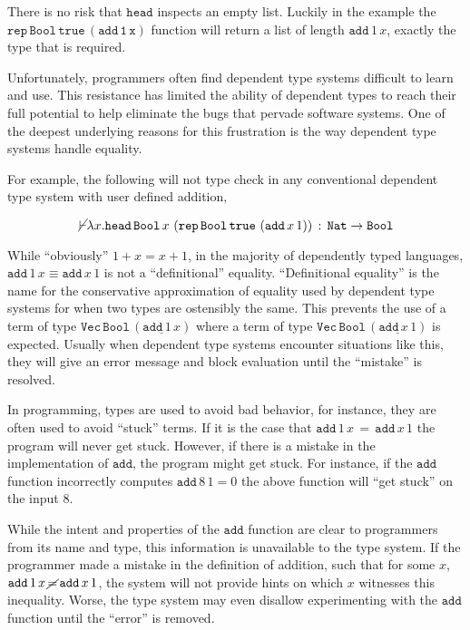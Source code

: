 There is no risk that $\mathtt{head}$ inspects an empty list.
Luckily in the example the $\mathtt{\mathtt{rep}\,\mathtt{Bool}\,\mathtt{true}\,\left(\mathtt{add}\,1\,x\right)}$ function will return a list of length $\mathtt{add}\,1\,x$, exactly the type that is required.


Unfortunately, programmers often find dependent type systems difficult to learn and use.
This resistance has limited the ability of dependent types to reach their full potential to help eliminate the bugs that pervade software systems.
One of the deepest underlying reasons for this frustration is the way dependent type systems handle equality.

For example, the following will not type check in any conventional dependent type system with user defined addition,

\[
\cancel{\vdash}\lambda x.\mathtt{head}\,\mathtt{Bool}\,x\,\left(\mathtt{rep}\,\mathtt{Bool}\,\mathtt{true}\,\left(\mathtt{add}\,x\,1\right)\right)\,:\,\mathtt{Nat}\rightarrow\mathtt{Bool}
\]

While ``obviously'' $1+x=x+1$, in the majority of dependently typed languages, $\mathtt{add}\,1\,x\equiv\mathtt{add}\,x\,1$ is not a ``definitional'' equality.
``Definitional equality'' is the name for the conservative approximation of equality used by dependent type systems for when two types are ostensibly the same.
This prevents the use of a term of type
$\mathtt{Vec}\,\mathtt{Bool}\,\left(\underline{\mathtt{add}\,1\,x}\right)$
where a term of type
$\mathtt{Vec}\,\mathtt{Bool}\,\left(\underline{\mathtt{add}\,x\,1}\right)$
is expected.
Usually when dependent type systems encounter situations like this, they will give an error message and block evaluation until the ``mistake'' is resolved.

In programming, types are used to avoid bad behavior, for instance, they are often used to avoid ``stuck'' terms.
If it is the case that $\mathtt{add}\,1\,x\,=\,\mathtt{add}\,x\,1$ the program will never get stuck.
However, if there is a mistake in the implementation of $\mathtt{add}$, the program might get stuck.
For instance, if the $\mathtt{add}$ function incorrectly computes $\mathtt{add}\,8\,1=0$ the above function will ``get stuck'' on the input $8$.

While the intent and properties of the $\mathtt{add}$ function are clear to programmers from its name and type, this information is unavailable to the type system.
If the programmer made a mistake in the definition of addition, such that for some $x$, $\mathtt{add}\,1\,x\,\cancel{=}\,\mathtt{add}\,x\,1$, the system will not provide hints on which $x$ witnesses this inequality.
Worse, the type system may even disallow experimenting with the $\mathtt{add}$ function until the ``error'' is removed.

